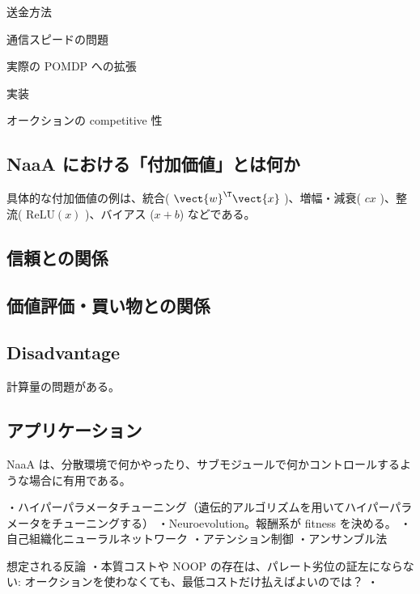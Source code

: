 送金方法

通信スピードの問題

実際の POMDP への拡張

実装

オークションの competitive 性

\subsection{NaaA における「付加価値」とは何か}
具体的な付加価値の例は、統合( $\vect{w}^\T \vect{x}$ )、増幅・減衰( $cx$ )、整流( $\mathrm{ReLU}(x)$ )、バイアス ($x+b$) などである。

\subsection{信頼との関係}
\subsection{価値評価・買い物との関係}

\subsection{Disadvantage}
計算量の問題がある。

\subsection{アプリケーション}
NaaA は、分散環境で何かやったり、サブモジュールで何かコントロールするような場合に有用である。

・ハイパーパラメータチューニング（遺伝的アルゴリズムを用いてハイパーパラメータをチューニングする）
	・Neuroevolution。報酬系が fitness を決める。
・自己組織化ニューラルネットワーク
・アテンション制御
・アンサンブル法
\fi


想定される反論
・本質コストや NOOP の存在は、パレート劣位の証左にならない: オークションを使わなくても、最低コストだけ払えばよいのでは？
・
\fi


